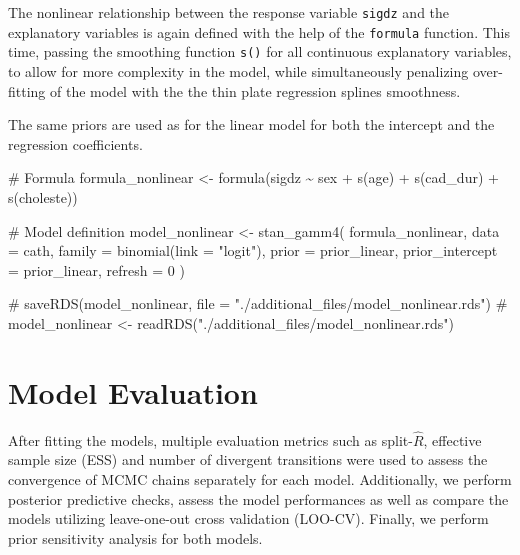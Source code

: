 \documentclass[
  letterpaper,
  DIV=11,
  numbers=noendperiod]{scrartcl}
\newenvironment{Shaded}{\begin{snugshade}}{\end{snugshade}}
\newcommand{\AttributeTok}[1]{\textcolor[rgb]{0.40,0.45,0.13}{#1}}
\newcommand{\CommentTok}[1]{\textcolor[rgb]{0.37,0.37,0.37}{#1}}
\newcommand{\DecValTok}[1]{\textcolor[rgb]{0.68,0.00,0.00}{#1}}
\newcommand{\FunctionTok}[1]{\textcolor[rgb]{0.28,0.35,0.67}{#1}}
\newcommand{\NormalTok}[1]{\textcolor[rgb]{0.00,0.23,0.31}{#1}}
\newcommand{\OtherTok}[1]{\textcolor[rgb]{0.00,0.23,0.31}{#1}}
\newcommand{\SpecialCharTok}[1]{\textcolor[rgb]{0.37,0.37,0.37}{#1}}
\newcommand{\StringTok}[1]{\textcolor[rgb]{0.13,0.47,0.30}{#1}}
\begin{document}
The nonlinear relationship between the response variable \texttt{sigdz}
and the explanatory variables is again defined with the help of the
\texttt{formula} function. This time, passing the smoothing function
\texttt{s()} for all continuous explanatory variables, to allow for more
complexity in the model, while simultaneously penalizing over-fitting of
the model with the the thin plate regression splines smoothness.

The same priors are used as for the linear model for both the intercept
and the regression coefficients.

\begin{Shaded}
\begin{Highlighting}[]
\CommentTok{\# Formula}
\NormalTok{formula\_nonlinear }\OtherTok{\textless{}{-}} \FunctionTok{formula}\NormalTok{(sigdz }\SpecialCharTok{\textasciitilde{}}\NormalTok{ sex }\SpecialCharTok{+} \FunctionTok{s}\NormalTok{(age) }\SpecialCharTok{+} \FunctionTok{s}\NormalTok{(cad\_dur) }\SpecialCharTok{+} \FunctionTok{s}\NormalTok{(choleste))}

\CommentTok{\# Model definition}
\NormalTok{model\_nonlinear }\OtherTok{\textless{}{-}} \FunctionTok{stan\_gamm4}\NormalTok{(}
\NormalTok{  formula\_nonlinear, }\AttributeTok{data =}\NormalTok{ cath,}
  \AttributeTok{family =} \FunctionTok{binomial}\NormalTok{(}\AttributeTok{link =} \StringTok{"logit"}\NormalTok{),}
  \AttributeTok{prior =}\NormalTok{ prior\_linear, }\AttributeTok{prior\_intercept =}\NormalTok{ prior\_linear,}
  \AttributeTok{refresh =} \DecValTok{0}
\NormalTok{)}

\CommentTok{\# saveRDS(model\_nonlinear, file = "./additional\_files/model\_nonlinear.rds")}
\CommentTok{\# model\_nonlinear \textless{}{-} readRDS("./additional\_files/model\_nonlinear.rds")}
\end{Highlighting}
\end{Shaded}

\hypertarget{model-evaluation}{%
\section{Model Evaluation}\label{model-evaluation}}

After fitting the models, multiple evaluation metrics such as
split-\(\hat{R}\), effective sample size (ESS) and number of divergent
transitions were used to assess the convergence of MCMC chains
separately for each model. Additionally, we perform posterior predictive
checks, assess the model performances as well as compare the models
utilizing leave-one-out cross validation (LOO-CV). Finally, we perform
prior sensitivity analysis for both models.
\end{document}
